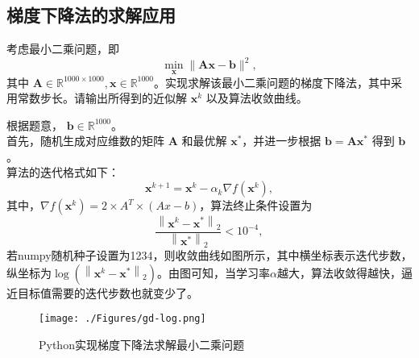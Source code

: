 \subsection{梯度下降法的求解应用}
\begin{example}[实践题]
    考虑最小二乘问题，即
    \begin{equation}
        \min _{\bm{x}}\|\bm{A} \bm{x}-\bm{b}\|^{2} ,
        \nonumber
    \end{equation}
其中 $\bm{A} \in \mathbb{R}^{1000 \times 1000}, \bm{x} \in \mathbb{R}^{1000}$。实现求解该最小二乘问题的梯度下降法，其中采用常数步长。请输出所得到的近似解 $\bm{x}^{k}$ 以及算法收敛曲线。
\end{example}
\begin{solution}
    根据题意， $\bm{b} \in \mathbb{R}^{1000}$。\\
    首先，随机生成对应维数的矩阵 $\bm{A}$ 和最优解 $\bm{x}^{*}$，并进一步根据 $\bm{b}=\bm{A} \bm{x}^{*}$ 得到 $\bm{b}$ 。\\
    算法的迭代格式如下：
    \begin{equation}
        \bm{x}^{k+1}=\bm{x}^{k}-\alpha_{k} \nabla f\left(\bm{x}^{k}\right),
        \nonumber
    \end{equation}
    其中，$\nabla f\left(\bm{x}^{k}\right)=2 \times A^T \times (Ax-b)$，算法终止条件设置为
    \begin{equation}
        \frac{\left\|\bm{x}^{k}-\bm{x}^{*}\right\|_{2}}{\left\|\bm{x}^{*}\right\|_{2}}<10^{-4},
        \nonumber
    \end{equation}
    若numpy随机种子设置为1234，则收敛曲线如图所示，其中横坐标表示迭代步数，纵坐标为$\log \left(\left\|\bm{x}^{k}-\bm{x}^{*}\right\|_{2}\right)$。由图可知，当学习率$\alpha$越大，算法收敛得越快，逼近目标值需要的迭代步数也就变少了。
    \begin{figure}[hbtp]
        \centering
        \texttt{[image: ./Figures/gd-log.png]}
        \caption{Python实现梯度下降法求解最小二乘问题}
        \label{figure_gd}
    \end{figure}
\end{solution}
